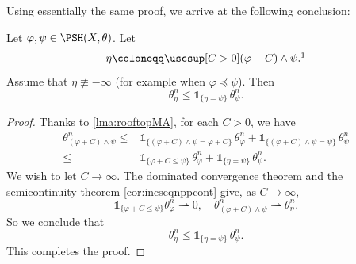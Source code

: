 Using essentially the same proof, we arrive at the following conclusion:
\begin{corollary}\label{cor:Pvarphisupport}
    Let $\varphi,\psi\in \PSH(X,\theta)$. Let
    \[
    \eta\coloneqq \uscsup[C>0] (\varphi+C)\land \psi.\footnotemark
    \]
    Assume that $\eta\not\equiv -\infty$ (for example when $\varphi\preceq \psi$).
    Then
    \[
    \theta_{\eta}^n\leq \mathds{1}_{\{\eta=\psi\}}\,\theta_{\psi}^n.
    \]
\end{corollary}
\begin{proof}
    Thanks to \cref{lma:rooftopMA}, for each $C>0$, we have
    \[
    \begin{aligned}
    \theta_{(\varphi+C)\land \psi}^n\leq & \mathds{1}_{\{(\varphi+C)\land \psi=\varphi+C\} }\, \theta_{\varphi}^n+\mathds{1}_{\{(\varphi+C)\land \psi=\psi\} }\, \theta_{\psi}^n\\
    \leq & \mathds{1}_{\{\varphi+C\leq \psi\} }\, \theta_{\varphi}^n+\mathds{1}_{\{\eta=\psi\} } \,\theta_{\psi}^n.
    \end{aligned}
    \]
    We wish to let $C\to\infty$.
    The dominated convergence theorem and the semicontinuity theorem \cref{cor:incseqnppcont} give, as $C\to\infty$,
    \[
    \mathds{1}_{\{\varphi+C\leq \psi\} } \theta_{\varphi}^n\rightharpoonup 0,\quad
    \theta_{(\varphi+C)\land \psi}^n\rightharpoonup \theta_{\eta}^n.
    \]
    So we conclude that
    \[
    \theta_{\eta}^n\leq \mathds{1}_{\{\eta=\psi\}} \,\theta_{\psi}^n.
    \]
    This completes the proof.
\end{proof}


